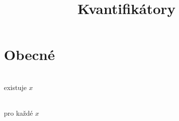 \documentclass[a4paper,11pt]{article}
\title{Kvantifikátory}
\begin{document}
\maketitle

\section{Obecné}

\begin{description}
    \item{}\\
        existuje $x$
    \item{}\\
        pro každé $x$
\end{description}
\end{document}
